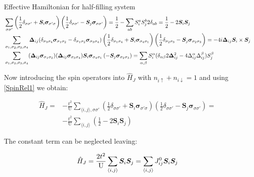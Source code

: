 \begin{section}{Effective Hamiltonian for half-filling system}
\begin{align}
&\sum_{\sigma \sigma'} \left(\frac{1}{2}\delta_{\sigma \sigma'} + \boldsymbol{S}_i\boldsymbol{\sigma}_{\sigma' \sigma}\right)\left(\frac{1}{2}\delta_{\sigma \sigma'}-\boldsymbol{S}_j\boldsymbol{\sigma}_{\sigma \sigma'}\right) =\frac{1}{2} - \sum_{ab} S_i^aS_j^b	2\delta_{ab} = \frac{1}{2} - 2\boldsymbol{S}_i\boldsymbol{S}_j \label{SpinRel1} \\
&\sum_{\sigma_1, \sigma_2, \sigma_3, \sigma_4}\boldsymbol{\Delta}_{ij}(\delta_{\sigma_3 \sigma_4}\boldsymbol{\sigma}_{\sigma_1 \sigma_2} - \delta_{\sigma_1 \sigma_2} \boldsymbol{\sigma}_{\sigma_3\sigma_4})\left(\frac{1}{2}\delta_{\sigma_1 \sigma_4} + \boldsymbol{S}_i\boldsymbol{\sigma}_{\sigma_4 \sigma_1}\right)\left(\frac{1}{2}\delta_{\sigma_2 \sigma_3}-\boldsymbol{S}_j\boldsymbol{\sigma}_{\sigma_2 \sigma_3}\right)= -4i \boldsymbol{\Delta}_{ij} \boldsymbol{S}_i \times \boldsymbol{S}_j \label{SpinRel2} \\
& \sum_{\sigma_1, \sigma_2, \sigma_3, \sigma_4} (\boldsymbol{\Delta}_{ij}\boldsymbol{\sigma}_{\sigma_1 \sigma_2})(\boldsymbol{\Delta}_{ij} \boldsymbol{\sigma}_{\sigma_3 \sigma_4})\boldsymbol{S}_i\boldsymbol{\sigma}_{\sigma_4 \sigma_1}\left(-\boldsymbol{S}_j\boldsymbol{\sigma}_{\sigma_2 \sigma_3}\right) = \sum_{\alpha, \beta} S_i^\alpha (\delta_{\alpha \beta} 2\boldsymbol{\Delta}_{ij}^2 - 4\Delta_{ij}^\alpha\Delta_{ij}^\beta ) S_j^\beta \label{SpinRel3}
\end{align}

Now introducing the spin operators into  $\hat{H}_J$ with $n_{i \uparrow} + n_{i \downarrow} = 1$ and using \ref{SpinRel1} we obtain:

\begin{align*}
\hat{H}_{J} = &-\frac{t^2}{\text{U}} \sum_{\langle i,j \rangle, \sigma \sigma'} \left(\frac{1}{2}\delta_{\sigma \sigma'} + \boldsymbol{S}_i\boldsymbol{\sigma}_{\sigma' \sigma}\right)\left(\frac{1}{2}\delta_{\sigma \sigma'}-\boldsymbol{S}_j\boldsymbol{\sigma}_{\sigma \sigma'}\right) = \\
&-\frac{t^2}{\text{U}}\sum_{\langle i,j \rangle} \left( \frac{1}{2} - 2\boldsymbol{S}_i\boldsymbol{S}_j \right)
\end{align*}

The constant term can be neglected leaving:

\begin{equation}
\hat{H}_{J} = \frac{2t^2}{\text{U}} \sum_{\langle i,j \rangle} \boldsymbol{S}_i\boldsymbol{S}_j = \sum_{\langle i,j \rangle} J_{ij}^0 \boldsymbol{S}_i\boldsymbol{S}_j
\end{equation}


\end{section}
